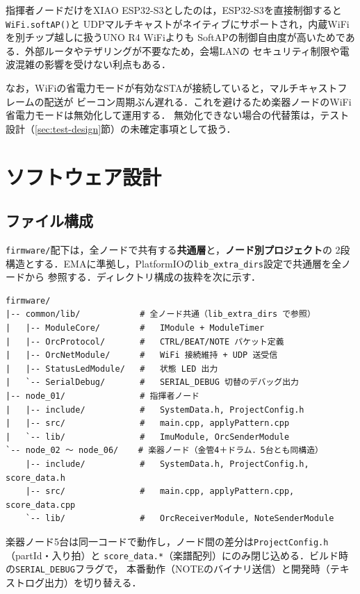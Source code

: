 \documentclass[lualatex,book,paper=a4paper,jafontsize=11.5pt,jafontscale=1.05]{jlreq}
\begin{document}
指揮者ノードだけをXIAO ESP32-S3としたのは，ESP32-S3を直接制御すると\texttt{WiFi.softAP()}と
UDPマルチキャストがネイティブにサポートされ，内蔵WiFiを別チップ越しに扱うUNO R4 WiFiよりも
SoftAPの制御自由度が高いためである．外部ルータやテザリングが不要なため，会場LANの
セキュリティ制限や電波混雑の影響を受けない利点もある．

なお，WiFiの省電力モードが有効なSTAが接続していると，マルチキャストフレームの配送が
ビーコン周期ぶん遅れる．これを避けるため楽器ノードのWiFi省電力モードは無効化して運用する．
無効化できない場合の代替策は，テスト設計（\ref{sec:test-design}節）の未確定事項として扱う．

\section{ソフトウェア設計}\label{sec:sw-design}

\subsection{ファイル構成}
\texttt{firmware/}配下は，全ノードで共有する\textbf{共通層}と，\textbf{ノード別プロジェクト}の
2段構造とする．EMAに準拠し，PlatformIOの\texttt{lib\_extra\_dirs}設定で共通層を全ノードから
参照する．ディレクトリ構成の抜粋を次に示す．
\begin{Verbatim}[frame=single,fontsize=\footnotesize,xleftmargin=4pt]
firmware/
|-- common/lib/            # 全ノード共通（lib_extra_dirs で参照）
|   |-- ModuleCore/        #   IModule + ModuleTimer
|   |-- OrcProtocol/       #   CTRL/BEAT/NOTE パケット定義
|   |-- OrcNetModule/      #   WiFi 接続維持 + UDP 送受信
|   |-- StatusLedModule/   #   状態 LED 出力
|   `-- SerialDebug/       #   SERIAL_DEBUG 切替のデバッグ出力
|-- node_01/               # 指揮者ノード
|   |-- include/           #   SystemData.h, ProjectConfig.h
|   |-- src/               #   main.cpp, applyPattern.cpp
|   `-- lib/               #   ImuModule, OrcSenderModule
`-- node_02 〜 node_06/    # 楽器ノード（金管4＋ドラム．5台とも同構造）
    |-- include/           #   SystemData.h, ProjectConfig.h, score_data.h
    |-- src/               #   main.cpp, applyPattern.cpp, score_data.cpp
    `-- lib/               #   OrcReceiverModule, NoteSenderModule
\end{Verbatim}
楽器ノード5台は同一コードで動作し，ノード間の差分は\texttt{ProjectConfig.h}（partId・入り拍）と
\texttt{score\_data.*}（楽譜配列）にのみ閉じ込める．ビルド時の\texttt{SERIAL\_DEBUG}フラグで，
本番動作（NOTEのバイナリ送信）と開発時（テキストログ出力）を切り替える．
\end{document}
